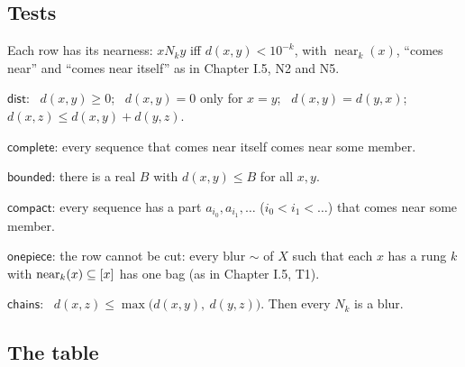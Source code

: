 \subsection*{Tests}

Each row has its nearness: $x \mathrel{N_k} y$ iff $d(x, y) < 10^{-k}$, with $\operatorname{near}_k(x)$, ``comes near'' and ``comes near itself'' as in Chapter I.5, N2 and N5.
\begin{lines}
\item[\lab{D1}] $\mathsf{dist}$: \ $d(x, y) \ge 0$; \ $d(x, y) = 0$ only for $x = y$; \ $d(x, y) = d(y, x)$; \ $d(x, z) \le d(x, y) + d(y, z)$.
\item[\lab{D2}] $\mathsf{complete}$: every sequence that comes near itself comes near some member.
\item[\lab{D3}] $\mathsf{bounded}$: there is a real $B$ with $d(x, y) \le B$ for all $x, y$.
\item[\lab{D4}] $\mathsf{compact}$: every sequence has a part $a_{i_0}, a_{i_1}, \dots$ ($i_0 < i_1 < \dots$) that comes near some member.
\item[\lab{D5}] $\mathsf{onepiece}$: the row cannot be cut: every blur $\sim$ of $X$ such that each $x$ has a rung $k$ with $\operatorname{near}_k(x) \subseteq [x]$ has one bag (as in Chapter I.5, T1).
\item[\lab{D6}] $\mathsf{chains}$: \ $d(x, z) \le \max\bigl(d(x, y),\ d(y, z)\bigr)$. Then every $N_k$ is a blur.
\end{lines}

\subsection*{The table}

